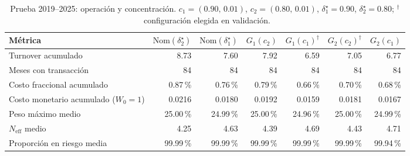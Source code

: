 \begin{table}[h]
\centering
\footnotesize
\setlength{\tabcolsep}{4pt}
\caption{Prueba 2019--2025: operación y concentración. $c_1=(0.90,\,0.01)$, $c_2=(0.80,\,0.01)$, $\delta_1^\star=0.90$, $\delta_2^\star=0.80$; $^{\dagger}$~configuración elegida en validación.}\label{tab:r2_b}
\begin{tabular}{|l|r|r|r|r|r|r|}
\hline
\textbf{Métrica} & \textbf{$\mathrm{Nom}(\delta_2^\star)$} & \textbf{$\mathrm{Nom}(\delta_1^\star)$} & \textbf{$G_1(c_2)$} & \textbf{$G_1(c_1)^{\dagger}$} & \textbf{$G_2(c_2)^{\dagger}$} & \textbf{$G_2(c_1)$} \\ \hline
Turnover acumulado & 8.73 & 7.60 & 7.92 & 6.59 & 7.05 & 6.77 \\ \hline
Meses con transacción & 84 & 84 & 84 & 84 & 84 & 84 \\ \hline
Costo fraccional acumulado & 0.87\,\% & 0.76\,\% & 0.79\,\% & 0.66\,\% & 0.70\,\% & 0.68\,\% \\ \hline
Costo monetario acumulado ($W_0=1$) & 0.0216 & 0.0180 & 0.0192 & 0.0159 & 0.0181 & 0.0167 \\ \hline
Peso máximo medio & 25.00\,\% & 24.99\,\% & 25.00\,\% & 24.96\,\% & 25.00\,\% & 24.99\,\% \\ \hline
$N_{\mathrm{eff}}$ medio & 4.25 & 4.63 & 4.39 & 4.69 & 4.43 & 4.71 \\ \hline
Proporción en riesgo media & 99.99\,\% & 99.99\,\% & 99.99\,\% & 99.99\,\% & 99.99\,\% & 99.94\,\% \\ \hline
\end{tabular}
\end{table}
